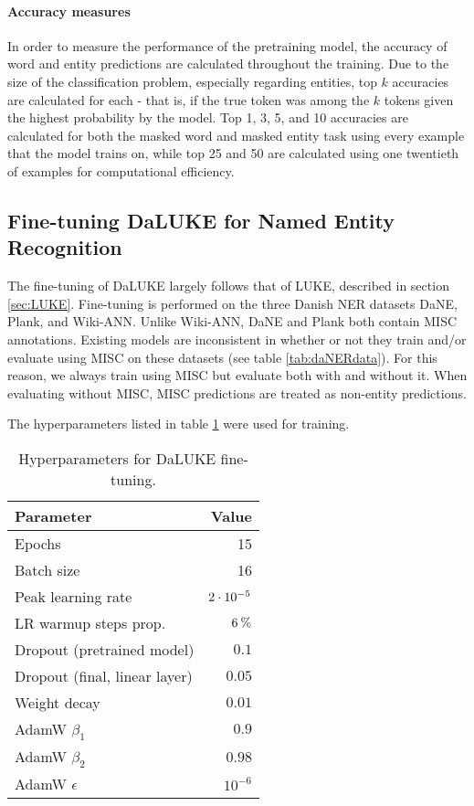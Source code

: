 \documentclass[main.tex]{subfiles}
\begin{document}
\paragraph{Accuracy measures}
In order to measure the performance of the pretraining model, the accuracy of word and entity predictions are calculated throughout the training.
Due to the size of the classification problem, especially regarding entities, top $ k $ accuracies are calculated for each - that is, if the true token was among the $ k $ tokens given the highest probability by the model.
Top 1, 3, 5, and 10 accuracies are calculated for both the masked word and masked entity task using every example that the model trains on, while top 25 and 50 are calculated using one twentieth of examples for computational efficiency.

\subsection{Fine-tuning DaLUKE for Named Entity Recognition}%
\label{sub:finetune-ner}
The fine-tuning of DaLUKE largely follows that of LUKE, described in section \ref{sec:LUKE}.
Fine-tuning is performed on the three Danish NER datasets DaNE, Plank, and Wiki-ANN.
Unlike Wiki-ANN, DaNE and Plank both contain MISC annotations.
Existing models are inconsistent in whether or not they train and/or evaluate using MISC on these datasets (see table \ref{tab:daNERdata}).
For this reason, we always train using MISC but evaluate both with and without it.
When evaluating without MISC, MISC predictions are treated as non-entity predictions.

The hyperparameters listed in table \ref{tab:finetune-hyper} were used for training.
\begin{table}[H]
    \centering
    \begin{tabular}{l|r}
        Parameter  &    Value\\\hline
        Epochs     & 15\\
        Batch size &    16\\
        Peak learning rate & $2\cdot10^{-5}$\\
        LR warmup steps prop. & $ 6\:\text{\%{}} $\\
        Dropout (pretrained model) & $ 0.1 $\\
        Dropout (final, linear layer) & $ 0.05 $\\
        Weight decay & $ 0.01 $\\
        AdamW $ \beta_1 $ & $ 0.9 $\\
        AdamW $ \beta_2 $ & $ 0.98 $\\
        AdamW $ \epsilon $ & $ 10^{-6} $
    \end{tabular}
    \caption{Hyperparameters for DaLUKE fine-tuning.}\label{tab:finetune-hyper}
\end{table}\noindent
\end{document}
